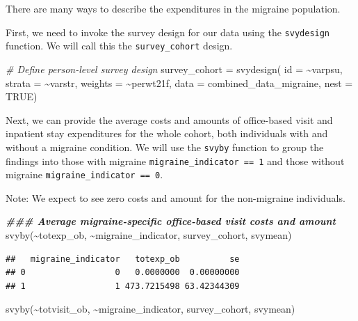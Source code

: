 \documentclass[
]{book}
\newenvironment{Shaded}{\begin{snugshade}}{\end{snugshade}}
\newcommand{\AttributeTok}[1]{\textcolor[rgb]{0.77,0.63,0.00}{#1}}
\newcommand{\CommentTok}[1]{\textcolor[rgb]{0.56,0.35,0.01}{\textit{#1}}}
\newcommand{\ConstantTok}[1]{\textcolor[rgb]{0.00,0.00,0.00}{#1}}
\newcommand{\DocumentationTok}[1]{\textcolor[rgb]{0.56,0.35,0.01}{\textbf{\textit{#1}}}}
\newcommand{\FunctionTok}[1]{\textcolor[rgb]{0.00,0.00,0.00}{#1}}
\newcommand{\NormalTok}[1]{#1}
\newcommand{\OtherTok}[1]{\textcolor[rgb]{0.56,0.35,0.01}{#1}}
\newcommand{\SpecialCharTok}[1]{\textcolor[rgb]{0.00,0.00,0.00}{#1}}
\begin{document}
There are many ways to describe the expenditures in the migraine population.

First, we need to invoke the survey design for our data using the \texttt{svydesign} function. We will call this the \texttt{survey\_cohort} design.

\begin{Shaded}
\begin{Highlighting}[]
\CommentTok{\# Define person{-}level survey design}
\NormalTok{survey\_cohort }\OtherTok{=} \FunctionTok{svydesign}\NormalTok{(}
  \AttributeTok{id =} \SpecialCharTok{\textasciitilde{}}\NormalTok{varpsu, }
  \AttributeTok{strata =} \SpecialCharTok{\textasciitilde{}}\NormalTok{varstr,}
  \AttributeTok{weights =} \SpecialCharTok{\textasciitilde{}}\NormalTok{perwt21f,}
  \AttributeTok{data =}\NormalTok{ combined\_data\_migraine,}
  \AttributeTok{nest =} \ConstantTok{TRUE}\NormalTok{)}
\end{Highlighting}
\end{Shaded}

Next, we can provide the average costs and amounts of office-based visit and inpatient stay expenditures for the whole cohort, both individuals with and without a migraine condition. We will use the \texttt{svyby} function to group the findings into those with migraine \texttt{migraine\_indicator\ ==\ 1} and those without migraine \texttt{migraine\_indicator\ ==\ 0}.

Note: We expect to see zero costs and amount for the non-migraine individuals.

\begin{Shaded}
\begin{Highlighting}[]
\DocumentationTok{\#\#\# Average migraine{-}specific office{-}based visit costs and amount}
\FunctionTok{svyby}\NormalTok{(}\SpecialCharTok{\textasciitilde{}}\NormalTok{totexp\_ob, }\SpecialCharTok{\textasciitilde{}}\NormalTok{migraine\_indicator, survey\_cohort, svymean)}
\end{Highlighting}
\end{Shaded}

\begin{verbatim}
##   migraine_indicator   totexp_ob          se
## 0                  0   0.0000000  0.00000000
## 1                  1 473.7215498 63.42344309
\end{verbatim}

\begin{Shaded}
\begin{Highlighting}[]
\FunctionTok{svyby}\NormalTok{(}\SpecialCharTok{\textasciitilde{}}\NormalTok{totvisit\_ob, }\SpecialCharTok{\textasciitilde{}}\NormalTok{migraine\_indicator, survey\_cohort, svymean)}
\end{Highlighting}
\end{Shaded}
\end{document}
